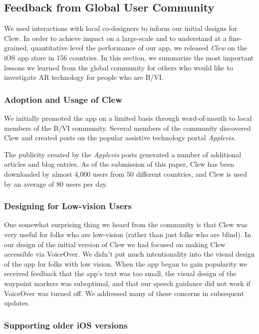 \documentclass[chi_draft]{sigchi}
\newcommand{\BVI}{B/VI\xspace}
\begin{document}
\subsection{Feedback from Global User Community}
We used interactions with local co-designers to inform our initial designs for Clew.  In order to achieve impact on a large-scale and to understand at a fine-grained, quantitative level the performance of our app, we released \emph{Clew} on the iOS app store in 156 countries.  In this section, we summarize the most important lessons we learned from the global community for others who would like to investigate AR technology for people who are \BVI.

\subsubsection{Adoption and Usage of Clew}

We initially promoted the app on a limited basis through word-of-mouth to local members of the \BVI community.  Several members of the community discovered Clew and created posts on the popular assistive technology portal \emph{Applevis}.

The publicity created by the \emph{Applevis} posts generated a number of additional articles and blog entries.  As of the submission of this paper, Clew has been downloaded by almost 4,000 users from 50 different countries, and Clew is used by an average of 80 users per day.


\subsubsection{Designing for Low-vision Users}
One somewhat surprising thing we heard from the community is that Clew was very useful for folks who are low-vision (rather than just folks who are blind).  In our design of the initial version of Clew we had focused on making Clew  accessible via VoiceOver.  We didn't put much intentionality into the visual design of the app for folks with low vision.  When the app began to gain popularity we received feedback that the app's text was too small, the visual design of the waypoint markers was suboptimal, and that our speech guidance did not work if VoiceOver was turned off.  We addressed many of these concerns in subsequent updates.

\subsubsection{Supporting older iOS versions}
\end{document}
